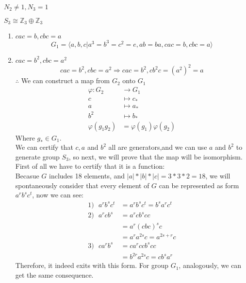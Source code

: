 \documentclass[a4paper,14pt]{article}
\begin{document}
\begin{enumerate}
\begin{item}{$N_2 \neq 1, N_3 = 1$}
\begin{enumerate}
\begin{item}{$S_3\cong \mathbb{Z}_3 \oplus \mathbb{Z}_3$}
\begin{enumerate}
                         \item $cac=b,cbc=a$
                            $$ G_1 = \langle a,b,c|a^3=b^3=c^2=e,ab=ba,cac=b,cbc=a \rangle $$
                        \item $cac=b^2,cbc=a^2$
                            $$ cac=b^2, cbc=a^2 \Rightarrow cac=b^2,cb^2c=(a^2)^2=a $$
                            $\therefore$ We can construct a map from $G_2$ onto $G_1$
                            \begin{align*}
                                \varphi:G_2 &\to G_1\\
                                c &\longmapsto c_*\\
                                a &\longmapsto a_*\\
                                b^2 &\longmapsto b_*\\
                                \varphi(g_1g_2) &= \varphi(g_1)\varphi(g_2)
                            \end{align*}
                            Where $g_* \in G_1$.\\
                            We can certify that $c,a$ and $b^2$ all are generators,and we can use $a$ and $b^2$ to generate group $S_3$, 
                            so next, we will prove that the map will be isomorphism. First of all we have to certify that it is a function:\\
                            Becasue $G$ includes 18 elements, and $|a|*|b|*|c|=3*3*2=18$, we will spontaneously consider that every element of $G$
                            can be represented as form $a^rb^sc^t$, now we can see:
                            \begin{align*}
                                1) \ \ \ a^{r}b^{s}c^t &= a^{r}b^{s}c^{t} = b^sa^rc^t\\
                                2) \ \ \ a^{r}cb^{s} &= a^{r}cb^scc\\
                                                    &= a^r(cbc)^sc\\
                                                    &= a^ra^{2s}c = a^{2s+r}c\\
                                3)\ \ \ ca^rb^s &= ca^rccb^scc\\
                                                &= b^{2r}a^{2s}c = cb^sa^r
                            \end{align*}
                            Therefore, it indeed exits with this form. For group $G_1$, analogously, we can get the same consequence.\\

\end{enumerate}
\end{item}
\end{enumerate}
\end{item}
\end{enumerate}
\end{document}

